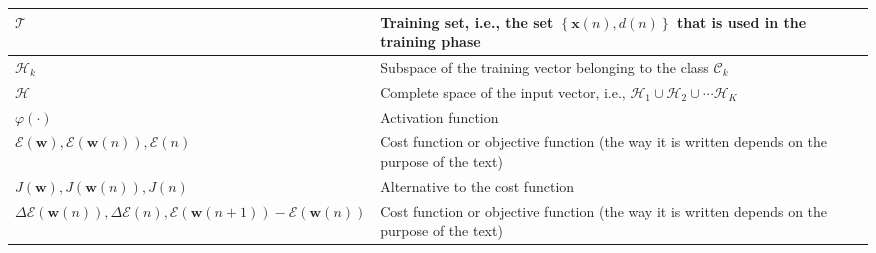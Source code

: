 \documentclass{article}
\begin{document}
\begin{xltabular}{\textwidth}{XX}
	\(\mathscr{T}\)                                                                                                       & Training set, i.e., the set \(\left\{ \mathbf{x}(n), d(n) \right\}\) that is used in the training phase \cite{bishopPatternRecognitionMachine2006}                                                                           \\ \hline
	\(\mathscr{H}_k\)                                                                                                     & Subspace of the training vector belonging to the class \(\mathscr{C}_k\)                                                                                                                                                     \\ \hline
	\(\mathscr{H}\)                                                                                                       & Complete space of the input vector, i.e., \(\mathscr{H}_1 \cup \mathscr{H}_2 \cup \cdots \mathscr{H}_K \)                                                                                                                    \\ \hline
	\(\varphi(\cdot)\)                                                                                                    & Activation function                                                                                                                                                                                                          \\ \hline
	\(\mathscr{E}(\mathbf{w}), \mathscr{E}(\mathbf{w}(n)), \mathscr{E}(n)\)                                               & Cost function or objective function (the way it is written depends on the purpose of the text)                                                                                                                               \\ \hline
	\(J(\mathbf{w}), J(\mathbf{w}(n)), J(n)\)                                                                             & Alternative to the cost function                                                                                                                                                                                             \\ \hline
	\(\Delta\mathscr{E}(\mathbf{w}(n)), \Delta\mathscr{E}(n), \mathscr{E}(\mathbf{w}(n+1)) - \mathscr{E}(\mathbf{w}(n))\) & Cost function or objective function (the way it is written depends on the purpose of the text)                                                                                                                               \\ \hline

\end{xltabular}
\end{document}
